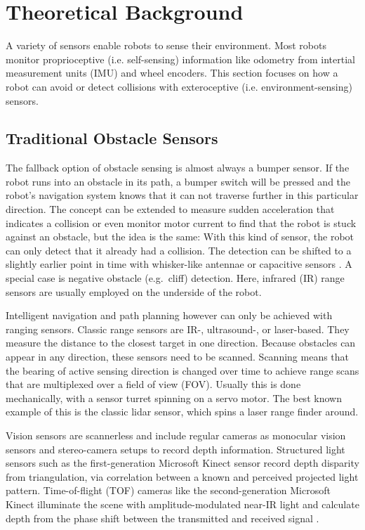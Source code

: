 
\chapter{Theoretical Background}\label{theoretical-background}

A variety of sensors enable robots to sense their environment. Most robots monitor proprioceptive (i.e. self-sensing) information like odometry from intertial measurement units (IMU) and wheel encoders. This section focuses on how a robot can avoid or detect collisions with exteroceptive (i.e. environment-sensing) sensors.

\section{Traditional Obstacle Sensors}\label{traditional-obstacle-sensors}

The fallback option of obstacle sensing is almost always a bumper
sensor. If the robot runs into an obstacle in its path, a bumper switch
will be pressed and the robot's navigation system knows that it can not
traverse further in this particular direction. The concept can be
extended to measure sudden acceleration that indicates a collision or
even monitor motor current to find that the robot is stuck against an
obstacle, but the idea is the same: With this kind of sensor, the robot
can only detect that it already had a collision. The detection can be
shifted to a slightly earlier point in time with whisker-like
antennae or capacitive sensors \cite{Muhlbacher-Karrer2015}. A special
case is negative obstacle (e.g.~cliff) detection. Here, infrared
(IR) range sensors are usually employed on the underside of the robot.

Intelligent navigation and path planning however can only be achieved
with ranging sensors. Classic range sensors are IR-, ultrasound-, or
laser-based. They measure the distance to the closest target in one
direction. Because obstacles can appear in any direction, these sensors
need to be scanned. Scanning means that the bearing of active sensing
direction is changed over time to achieve range scans that are
multiplexed over a field of view (FOV). Usually this is done
mechanically, with a sensor turret spinning on a servo motor. The best
known example of this is the classic lidar sensor, which spins a laser
range finder around.

Vision sensors are scannerless and include regular cameras as monocular
vision sensors and stereo-camera setups to record depth
information. Structured light sensors such as the first-generation
Microsoft Kinect sensor record depth disparity from triangulation, via
correlation between a known and perceived projected light pattern.
Time-of-flight (TOF) cameras like the second-generation Microsoft Kinect
illuminate the scene with amplitude-modulated near-IR light and
calculate depth from the phase shift between the transmitted and
received signal \cite{Sarbolandi2015}.


